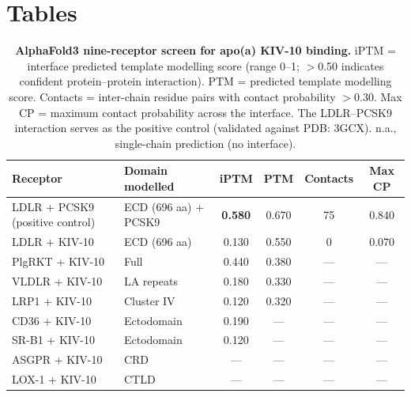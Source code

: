 \documentclass[11pt,a4paper]{article}
\begin{document}
\clearpage
\section*{Tables}

\begin{table}[H]
\centering
\caption{\textbf{AlphaFold3 nine-receptor screen for apo(a) KIV-10 binding.} iPTM = interface predicted template modelling score (range 0--1; $>$0.50 indicates confident protein--protein interaction). PTM = predicted template modelling score. Contacts = inter-chain residue pairs with contact probability $>$0.30. Max CP = maximum contact probability across the interface. The LDLR--PCSK9 interaction serves as the positive control (validated against PDB: 3GCX). n.a., single-chain prediction (no interface). }
\label{tab:receptor_screen}
\small
\begin{tabular}{@{}llcccc@{}}
\toprule
\textbf{Receptor} & \textbf{Domain modelled} & \textbf{iPTM} & \textbf{PTM} & \textbf{Contacts} & \textbf{Max CP} \\
\midrule
LDLR + PCSK9 (positive control) & ECD (696 aa) + PCSK9 & \textbf{0.580} & 0.670 & 75 & 0.840 \\
\midrule
LDLR + KIV-10 & ECD (696 aa) & 0.130 & 0.550 & 0 & 0.070 \\
PlgRKT + KIV-10 & Full & 0.440 & 0.380 & --- & --- \\
VLDLR + KIV-10 & LA repeats & 0.180 & 0.330 & --- & --- \\
LRP1 + KIV-10 & Cluster IV & 0.120 & 0.320 & --- & --- \\
CD36 + KIV-10 & Ectodomain & 0.190 & --- & --- & --- \\
SR-B1 + KIV-10 & Ectodomain & 0.120 & --- & --- & --- \\
ASGPR + KIV-10 & CRD & --- & --- & --- & --- \\
LOX-1 + KIV-10 & CTLD & --- & --- & --- & --- \\
\bottomrule
\end{tabular}
\end{table}
\end{document}
